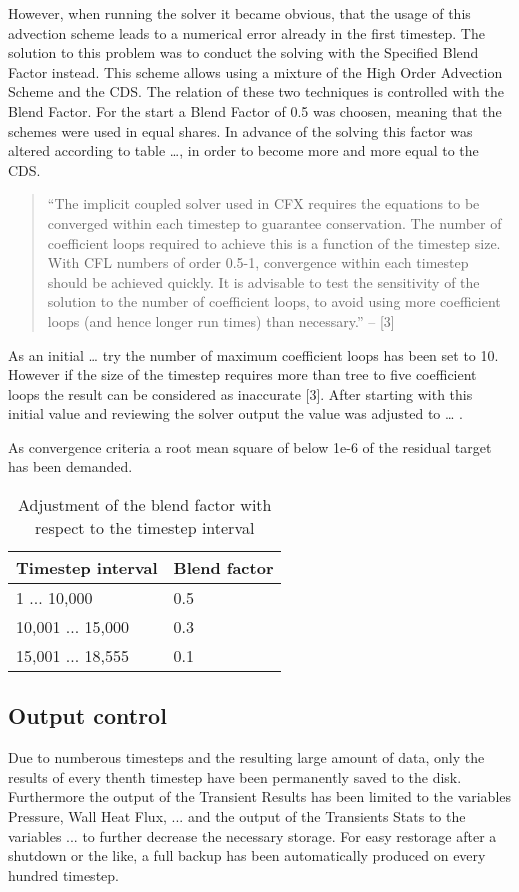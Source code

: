 However, when running the solver it became obvious, that the usage of this advection scheme leads to a numerical error already in the first timestep. The solution to this problem was to conduct the solving with the Specified Blend Factor instead. This scheme allows using a mixture of the High Order Advection Scheme and the CDS. The relation of these two techniques is controlled with the Blend Factor. For the start a Blend Factor of 0.5 was choosen, meaning that the schemes were used in equal shares. In advance of the solving this factor was altered according to table …, in order to become more and more equal to the CDS. 

\begin{quote}
``The implicit coupled solver used in CFX requires the equations to be converged within each timestep to guarantee conservation. The number of coefficient loops required to achieve this is a function of the timestep size. With CFL numbers of order 0.5-1, convergence within each timestep should be achieved quickly. It is advisable to test the sensitivity of the solution to the number of coefficient loops, to avoid using more coefficient loops (and hence longer run times) than necessary.'' – [3]
\end{quote}

As an initial … try the number of maximum coefficient loops has been set to 10. However if the size of the timestep requires more than tree to five coefficient loops the result can be considered as inaccurate [3]. After starting with this initial value and reviewing the solver output the value was adjusted to … .

As convergence criteria a root mean square of below 1e-6 of the residual target has been demanded.

\begin{table}[h]
\centering
\caption{Adjustment of the blend factor with respect to the timestep interval}
\label{tab:blend_factor}
\begin{tabular}{ll}
Timestep interval&Blend factor\\
\hline
1 ... 10,000&0.5\\
10,001 ... 15,000&0.3\\
15,001 ... 18,555&0.1\\
\end{tabular}
\end{table}

\subsection{Output control}
Due to numberous timesteps and the resulting large amount of data, only the results of every thenth timestep have been permanently saved to the disk. Furthermore the output of the Transient Results has been limited to the variables Pressure, Wall Heat Flux, ... and the output of the Transients Stats to the variables ... to further decrease the necessary storage.
For easy restorage after a shutdown or the like, a full backup has been automatically produced on every hundred timestep.
